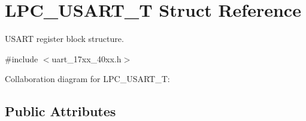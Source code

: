 \hypertarget{structLPC__USART__T}{}\section{L\+P\+C\+\_\+\+U\+S\+A\+R\+T\+\_\+T Struct Reference}
\label{structLPC__USART__T}


U\+S\+A\+RT register block structure.  




{\ttfamily \#include $<$uart\+\_\+17xx\+\_\+40xx.\+h$>$}



Collaboration diagram for L\+P\+C\+\_\+\+U\+S\+A\+R\+T\+\_\+T\+:
\subsection*{Public Attributes}
